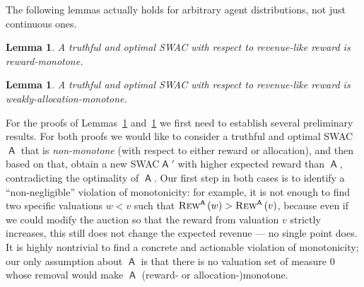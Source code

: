 \documentclass[11pt,letterpaper]{article}
\newcommand{\swir}{stagewise-IR\xspace}
\newcommand{\wamono}{weakly-allocation-monotone\xspace}
\newcommand{\rmono}{reward-monotone\xspace}
\newcommand{\swac}{SWAC\xspace}
\newcommand \sett[2] { \left.\left\{{#1}\medspace\right\vert\medspace{#2}\right\}}
\DeclareMathOperator{\A}{\auc{A}}
\DeclareMathOperator{\V}{\mathcal{V}}
\theoremstyle{plain}
\newtheorem{lemma}[theorem]{Lemma}
\newcommand{\auc}[1]{\mathsf{#1}}
\begin{document}
The following lemmas actually holds for arbitrary agent distributions, not just continuous ones.


\begin{lemma}\label{lemma:rev-like-rmono}
     A truthful and optimal \swac with respect to revenue-like reward is \rmono.
\end{lemma}

\begin{lemma}\label{lemma:rev-like-wamono}
     A truthful and optimal \swac with respect to revenue-like reward is \wamono.
\end{lemma}

For the proofs of Lemmas~\ref{lemma:rev-like-rmono} and~\ref{lemma:rev-like-wamono} we first need to establish several preliminary results. 
For both proofs we would like to consider a truthful and optimal \swac $\A$ that is \emph{non-monotone} (with respect to either reward or allocation), and then based on that,
     obtain a new \swac $\A'$ with higher expected reward than $\A$, contradicting the optimality of $\A$.
     Our first step in both cases is to identify a ``non-negligible'' violation of monotonicity:
    for example, it is not enough to find two specific valuations $w < v$
    such that $\trew[\A]{w} > \trew[\A]{v}$,
    because even if we could modify the auction so that the reward from valuation $v$ strictly increases,
    this still does not change the expected revenue --- no single point does.
    It is highly nontrivial to find a concrete and actionable violation of monotonicity;
    our only assumption about $\A$ is that
    there is no valuation set of measure 0 whose removal would make $\A$ (reward- or allocation-)monotone.



            
\end{document}
